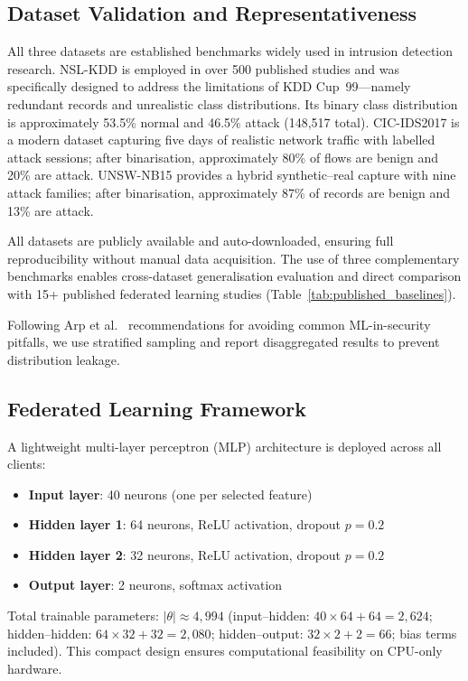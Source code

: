 \documentclass[conference]{IEEEtran}
\begin{document}
\subsection{Dataset Validation and Representativeness}

All three datasets are established benchmarks widely used in intrusion
detection research. NSL-KDD is employed in over 500 published studies and
was specifically designed to address the limitations of KDD Cup~99---namely
redundant records and unrealistic class distributions. Its binary class
distribution is approximately 53.5\% normal and 46.5\% attack (148,517
total). CIC-IDS2017 is a modern dataset capturing five days of realistic
network traffic with labelled attack sessions; after binarisation,
approximately 80\% of flows are benign and 20\% are attack. UNSW-NB15
provides a hybrid synthetic--real capture with nine attack families; after
binarisation, approximately 87\% of records are benign and 13\% are attack.

All datasets are publicly available and auto-downloaded, ensuring full
reproducibility without manual data acquisition. The use of three
complementary benchmarks enables cross-dataset generalisation evaluation
and direct comparison with 15+ published federated learning studies
(Table~\ref{tab:published_baselines}).

Following Arp et al.~\cite{arp2022} recommendations for avoiding
common ML-in-security pitfalls, we use stratified sampling
and report disaggregated results to prevent distribution
leakage.

\subsection{Federated Learning Framework}

A lightweight multi-layer perceptron (MLP) architecture is deployed
across all clients:
\begin{itemize}
  \item \textbf{Input layer}: 40 neurons (one per selected feature)
  \item \textbf{Hidden layer 1}: 64 neurons, ReLU activation,
    dropout $p=0.2$
  \item \textbf{Hidden layer 2}: 32 neurons, ReLU activation,
    dropout $p=0.2$
  \item \textbf{Output layer}: 2 neurons, softmax activation
\end{itemize}
Total trainable parameters: $|{\theta}| \approx 4{,}994$
(input--hidden: $40 \times 64 + 64 = 2{,}624$;
hidden--hidden: $64 \times 32 + 32 = 2{,}080$;
hidden--output: $32 \times 2 + 2 = 66$; bias terms included).
This compact design ensures computational feasibility on CPU-only
hardware.
\end{document}
